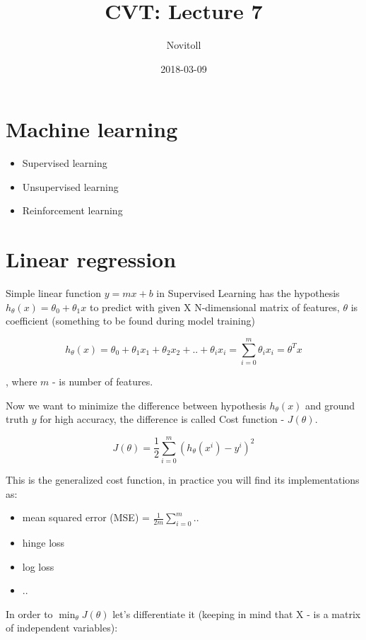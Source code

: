 \documentclass[11pt]{article}
\title{CVT: Lecture 7}
\date{2018-03-09}
\author{Novitoll}
\begin{document}
    \maketitle

    \section{Machine learning} \label{sec:mlintro}

    \begin{itemize}
        \item Supervised learning
        \item Unsupervised learning
        \item Reinforcement learning
    \end{itemize}

    \section{Linear regression} \label{sec:linearreg}

    Simple linear function $y = mx + b$ in Supervised Learning has the hypothesis $h_\theta(x) = \theta_0 + \theta_1 x$
    to predict with given X N-dimensional matrix of features, $\theta$ is coefficient (something to be found during model training)

    \[
        h_\theta(x) = \theta_0 + \theta_1 x_1 + \theta_2 x_2 + .. + \theta_i x_i = \sum_{i=0}^{m} \theta_i x_i = \theta^T x
    \]

    , where $m$ - is number of features.

    Now we want to minimize the difference between hypothesis $h_\theta(x)$ and ground truth $y$ for high accuracy,
    the difference is called Cost function - $J(\theta)$.

    \[
        J(\theta) = \frac{1}{2}\sum_{i=0}^{m} (h_\theta(x^i) - y^i)^2
    \]

    This is the generalized cost function, in practice you will find its implementations as:
    \begin{itemize}
        \item mean squared error (MSE) = $\frac{1}{2m}\sum_{i=0}^{m}..$
        \item hinge loss
        \item log loss
        \item ..
    \end{itemize}

    In order to $\min_{\theta} J(\theta)$ let's differentiate it (keeping in mind that X - is a matrix of independent variables):
\end{document}
